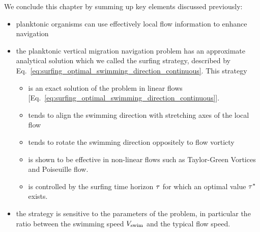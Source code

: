 We conclude this chapter by summing up key elements discussed previously:
\begin{itemize}
	\item planktonic organisms can use effectively local flow information to enhance navigation
	\item the planktonic vertical migration navigation problem has an approximate analytical solution which we called the surfing strategy, described by Eq.~\eqref{eq:surfing_optimal_swimming_direction_continuous}. This strategy
	\begin{itemize}
        \item is an exact solution of the problem in linear flows [Eq.~\eqref{eq:surfing_optimal_swimming_direction_continuous}].
        \item tends to align the swimming direction with stretching axes of the local flow
        \item tends to rotate the swimming direction oppositely to flow vorticty
        \item is shown to be effective in non-linear flows such as Taylor-Green Vortices and Poiseuille flow.
        \item is controlled by the surfing time horizon $\tau$ for which an optimal value $\tau^*$ exists.
    \end{itemize}
    \item the strategy is sensitive to the parameters of the problem, in particular the ratio between the swimming speed $V_{\mathrm{swim}}$ and the typical flow speed.
\end{itemize}
